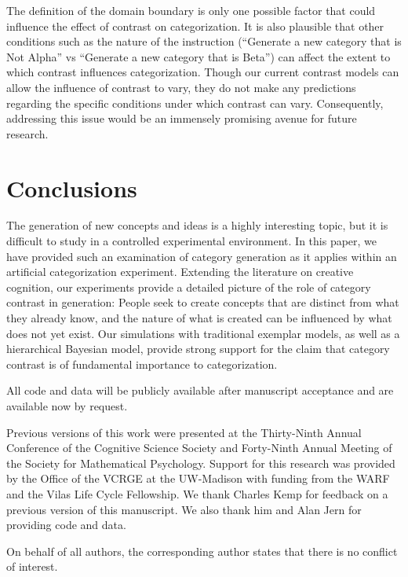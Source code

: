 \documentclass[pdflatex,sn-apa]{sn-jnl}%
\theoremstyle{thmstyleone}%
\theoremstyle{thmstyletwo}%
\theoremstyle{thmstylethree}%
\begin{document}
The definition of the domain boundary is only one possible factor that could
influence the effect of contrast on categorization. It is also plausible that
other conditions such as the nature of the instruction (``Generate a new
category that is Not Alpha'' vs ``Generate a new category that is Beta'') 
can affect the extent to which contrast influences categorization. Though our
current contrast models can allow the influence of contrast to vary, they do not
make any predictions regarding the specific conditions under which contrast can
vary. Consequently, addressing this issue would be an immensely promising avenue
for future research.

\section{Conclusions}

The generation of new concepts and ideas is a highly interesting topic, but it
is difficult to study in a controlled experimental environment. In this paper,
we have provided such an examination of category generation as it applies within
an artificial categorization experiment. Extending the literature on creative
cognition, our experiments provide a detailed picture of the role of category
contrast in generation: People seek to create concepts that are distinct from
what they already know, and the nature of what is created can be influenced by
what does not yet exist. Our simulations with traditional exemplar models, as
well as a hierarchical Bayesian model, provide strong support for the claim that
category contrast is of fundamental importance to categorization.


\backmatter


All code and data will be publicly available after manuscript acceptance and are available now by request.


Previous versions of this work were presented at the
Thirty-Ninth Annual Conference of the Cognitive Science Society and Forty-Ninth
Annual Meeting of the Society for Mathematical Psychology. Support for this
research was provided by the Office of the VCRGE at the UW-Madison with
funding from the WARF and the Vilas Life Cycle Fellowship. We thank Charles Kemp
for feedback on a previous version of this manuscript. We also thank him and
Alan Jern for providing code and data.

On behalf of all authors, the corresponding author states that there is no conflict of interest.
\end{document}
